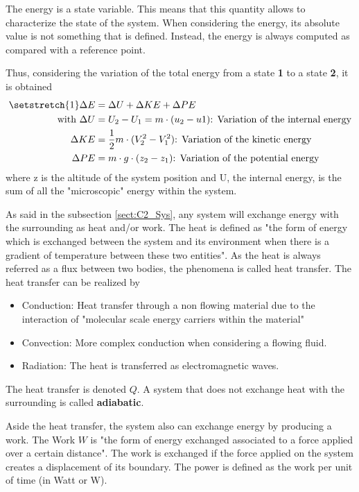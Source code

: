The energy is a state variable. This means that this quantity allows to characterize the state of the system. When considering the energy, its absolute value is not something that is defined. Instead, the energy is always computed as compared with a reference point.

Thus, considering the variation of the total energy from a state \textbf{1} to a state \textbf{2}, it is obtained
\begin{align}
\setstretch{1}
    \Delta E &= \Delta U + \Delta KE + \Delta PE \label{eq:C2_E}\\
    \text{with } \Delta U  &= U_2 - U_1 =  m\cdot(u_2 - u1) \text{: Variation of the internal energy}\nonumber\\
                 \Delta KE &= \frac{1}{2}m\cdot(V^2_2 - V^2_1)\text{: Variation of the kinetic energy}\nonumber\\
                 \Delta PE &= m\cdot g\cdot(z_2 - z_1)\text{: Variation of the potential energy}\nonumber
\end{align} 
where z is the altitude of the system position and U, the internal energy, is the sum of all the "microscopic" energy within the system.

As said in the subsection \ref{sect:C2_Sys}, any system will exchange energy with the surrounding as heat and/or work. The heat is defined as "the form of energy which is exchanged between the system and its environment when there is a gradient of temperature between these two entities". As the heat is always referred as a flux between two bodies, the phenomena is called heat transfer. The heat transfer can be realized by
\begin{itemize}
    \item Conduction: Heat transfer through a non flowing material due to the interaction of "molecular scale energy carriers within the material"\cite{GregoryNellis2015}
    \item Convection: More complex conduction when considering a flowing fluid.
    \item Radiation: The heat is transferred as electromagnetic waves.
\end{itemize}
The heat transfer is denoted $Q$. A system that does not exchange heat with the surrounding is called \textbf{adiabatic}.

Aside the heat transfer, the system also can exchange energy by producing a work. The Work $W$ is "the form of energy exchanged associated to a force applied over a certain distance". The work is exchanged if the force applied on the system creates a displacement of its boundary. The power is defined as the work per unit of time (in Watt or W).


